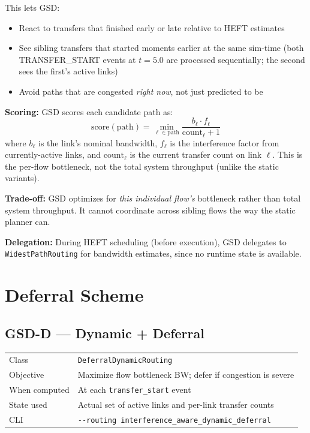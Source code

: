 \documentclass[11pt]{article}
\begin{document}
\medskip
This lets GSD:
\begin{itemize}
\item React to transfers that finished early or late relative to HEFT estimates
\item See sibling transfers that started moments earlier at the same sim-time
      (both TRANSFER\_START events at $t=5.0$ are processed sequentially; the
      second sees the first's active links)
\item Avoid paths that are congested \emph{right now}, not just predicted to be
\end{itemize}

\textbf{Scoring:} GSD scores each candidate path as:
\[
  \text{score}(\text{path}) = \min_{\ell \in \text{path}}
  \frac{b_\ell \cdot f_\ell}{\text{count}_\ell + 1}
\]
where $b_\ell$ is the link's nominal bandwidth, $f_\ell$ is the interference
factor from currently-active links, and $\text{count}_\ell$ is the current
transfer count on link $\ell$.  This is the per-flow bottleneck, not the
total system throughput (unlike the static variants).

\textbf{Trade-off:} GSD optimizes for \emph{this individual flow's}
bottleneck rather than total system throughput.  It cannot coordinate across
sibling flows the way the static planner can.

\textbf{Delegation:} During HEFT scheduling (before execution), GSD
delegates to \texttt{WidestPathRouting} for bandwidth estimates, since no
runtime state is available.

\section{Deferral Scheme}

\subsection{GSD-D --- Dynamic + Deferral}

\begin{tabular}{@{}lp{9cm}@{}}
\toprule
Class          & \texttt{DeferralDynamicRouting} \\
Objective      & Maximize flow bottleneck BW; defer if congestion is severe \\
When computed  & At each \texttt{transfer\_start} event \\
State used     & Actual set of active links and per-link transfer counts \\
CLI            & \texttt{-{}-routing interference\_aware\_dynamic\_deferral} \\
\bottomrule
\end{tabular}
\end{document}
